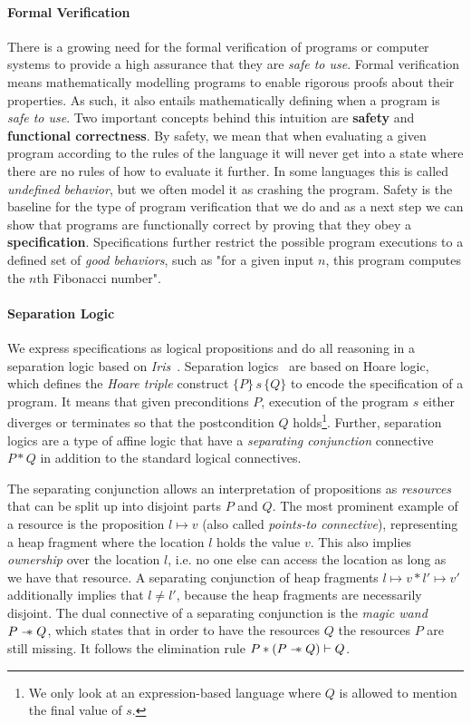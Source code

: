 \paragraph{Formal Verification}
There is a growing need for the formal verification of programs or computer systems to provide a high assurance that they are \emph{safe to use}.
Formal verification means mathematically modelling programs to enable rigorous proofs about their properties.
As such, it also entails mathematically defining when a program is \emph{safe to use}.
Two important concepts behind this intuition are \textbf{safety} and \textbf{functional correctness}.
By safety, we mean that when evaluating a given program according to the rules of the language
it will never get into a state where there are no rules of how to evaluate it further.
In some languages this is called \emph{undefined behavior}, but we often model it as crashing the program.
Safety is the baseline for the type of program verification that we do and as a next step we can show that programs are functionally correct by proving that they obey a \textbf{specification}.
Specifications further restrict the possible program executions to a defined set of \emph{good behaviors}, such as "for a given input \(n\), this program computes the \(n\)th Fibonacci number".

\paragraph{Separation Logic}
We express specifications as logical propositions and do all reasoning in a separation logic based on \emph{Iris}~\cite{jung2018iris}.
Separation logics~\cite{reynolds2002separation} are based on Hoare logic, which defines the \emph{Hoare triple} construct \(\{P\}\,s\,\{Q\}\) to encode the specification of a program.
It means that given preconditions \(P\), execution of the program \(s\) either diverges or terminates so that the postcondition \(Q\) holds\footnote{We only look at an expression-based language where \(Q\) is allowed to mention the final value of \(s\).}.
Further, separation logics are a type of affine logic that have a \emph{separating conjunction} connective \(P \ast Q\) in addition to the standard logical connectives.

The separating conjunction allows an interpretation of propositions as \emph{resources} that can be split up into disjoint parts \(P\) and \(Q\).
The most prominent example of a resource is the proposition \(l \mapsto v\) (also called \emph{points-to connective}), representing a heap fragment where the location \(l\) holds the value \(v\).
This also implies \emph{ownership} over the location \(l\), i.e. no one else can access the location as long as we have that resource.
A separating conjunction of heap fragments \(l \mapsto v \ast l' \mapsto v'\) additionally implies that \(l \neq l'\), because the heap fragments are necessarily disjoint.
The dual connective of a separating conjunction is the \emph{magic wand} \(P \mathrel{-\!\!\ast} Q\), which states that in order to have the resources \(Q\) the resources \(P\) are still missing. 
It follows the elimination rule \(P \ast (P \mathrel{-\!\!\ast} Q) \vdash Q\).

